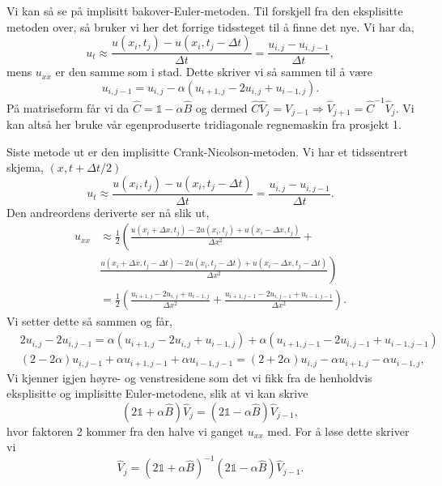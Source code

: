 \documentclass[norsk, 10pt]{article}
\def\para#1{\left( #1 \right)}
\begin{document}
Vi kan så se på implisitt bakover-Euler-metoden. Til forskjell fra den eksplisitte metoden over, så bruker vi her det forrige tidssteget til å finne det nye. Vi har da,
 \[
u_t\approx \frac{u(x_i,t_j)-u(x_i,t_j-\Delta t)}{\Delta t} = \frac{u_{i,j}-u_{i,j-1}}{\Delta t},
\]
mens $u_{xx}$ er den samme som i stad. Dette skriver vi så sammen til å være
\begin{equation}
u_{i,j-1} = u_{i,j} - \alpha\para{u_{i+1,j}-2u_{i,j}+u_{i-1,j}}. \label{eq:implisitt}
\end{equation}
På matriseform får vi da $\hat C = \mathbb 1 - \alpha \hat B$ og dermed $\hat C \hat V_j = V_{j-1} \Rightarrow \hat V_{j+1} = \hat C^{-1}\hat V_{j}$. Vi kan altså her bruke vår egenproduserte tridiagonale regnemaskin fra prosjekt 1.

Siste metode ut er den implisitte Crank-Nicolson-metoden. Vi har et tidssentrert skjema, $(x,t+\Delta t/2)$
 \begin{equation}
u_t\approx \frac{u(x_i,t_j)-u(x_i,t_j-\Delta t)}{\Delta t} = \frac{u_{i,j}-u_{i,j-1}}{\Delta t}.\label{eq:CNtid}
 \end{equation}
Den andreordens deriverte ser nå slik ut,
\begin{align}
u_{xx}&\approx \frac{1}{2}\left(\frac{u(x_i+\Delta x,t_j)-2u(x_i,t_j)+u(x_i-\Delta x,t_j)}{\Delta x^2}+\right.\nonumber\\
&\left. \frac{u(x_i+\Delta x,t_j-\Delta t)-2u(x_i,t_j-\Delta t)+u(x_i-\Delta x,t_j-\Delta t)}{\Delta x^2} \right)\nonumber \\
& = \frac{1}{2}\left(\frac{u_{i+1,j}-2u_{i,j}+u_{i-1,j}}{\Delta x^2}+\frac{u_{i+1,j-1}-2u_{i,j-1}+u_{i-1,j-1}}{\Delta x^2} \right).\label{eq:CNpos}
\end{align}
Vi setter dette så sammen og får,
\begin{align}
& 2u_{i,j}-2u_{i,j-1} = \alpha\para{u_{i+1,j}-2u_{i,j}+u_{i-1,j}}+\alpha\para{u_{i+1,j-1}-2u_{i,j-1}+u_{i-1,j-1}} \nonumber\\
& (2 -2\alpha)u_{i,j-1}+ \alpha u_{i+1,j-1}+\alpha u_{i-1,j-1} = (2+2\alpha) u_{i,j} - \alpha u_{i+1,j}-\alpha u_{i-1,j}, \label{eq:CNmetode}
\end{align}
Vi kjenner igjen høyre- og venstresidene som det vi fikk fra de henholdvis eksplisitte og implisitte Euler-metodene, slik at vi kan skrive
$$ (2\mathbb 1 + \alpha \hat B)\hat V_j = (2\mathbb 1 - \alpha \hat B)\hat V_{j-1},$$
hvor faktoren 2 kommer fra den halve vi ganget $u_{xx}$ med. For å løse dette skriver vi
$$ \hat V_j = (2\mathbb 1 + \alpha \hat B)^{-1}(2\mathbb 1 - \alpha \hat B)\hat V_{j-1}. $$
\end{document}
